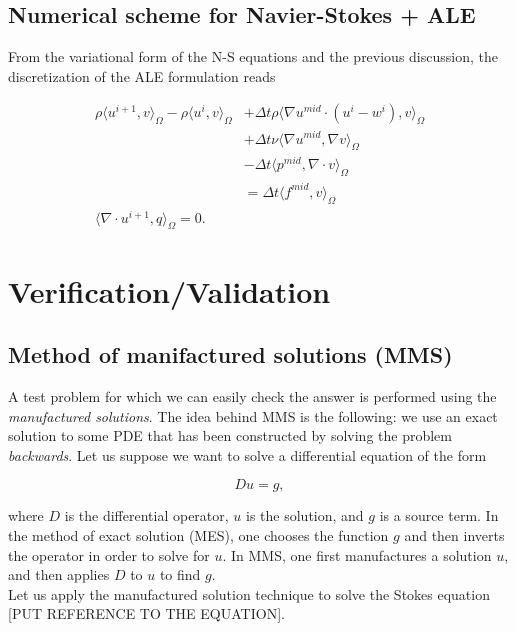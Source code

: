 \documentclass[11pt,a4paper,titlepage]{report}
\begin{document}
\section{Numerical scheme for Navier-Stokes + ALE}
From the variational form of the N-S equations and the previous discussion, the discretization of the ALE formulation reads

\[
\begin{aligned}
\rho \langle u^{i+1},v \rangle_\Omega - \rho \langle u^i, v \rangle_\Omega & + \Delta t \rho \langle \nabla u^{mid} \cdot (u^i -w^i)  ,v \rangle_\Omega \\
& + \Delta t \nu \langle \nabla u^{mid}, \nabla v \rangle_\Omega \\
& - \Delta t \langle p^{mid} , \nabla \cdot v \rangle_\Omega \\
& = \Delta t \langle f^{mid} ,v \rangle_\Omega \\
\langle \nabla \cdot u^{i+1},q \rangle_\Omega = 0.
\end{aligned}
\]



\chapter{Verification/Validation}

\section{Method of manifactured solutions (MMS)}

A test problem for which we can easily check the answer is performed using the \textit{manufactured solutions}. The idea behind MMS is the following: we use an exact solution to some PDE that has been constructed by solving the problem \textit{backwards}. Let us suppose we want to solve a differential equation of the form 

\[
Du = g,
\]

where $D$ is the differential operator, $u$ is the solution, and $g$ is a source term. In the method of exact solution (MES), one chooses the function $g$ and then inverts the operator in order to solve for $u$. In MMS, one first manufactures a solution $u$, and then applies $D$ to $u$ to find $g$. \\

Let us apply the manufactured solution technique to solve the Stokes equation [PUT REFERENCE TO THE EQUATION]. 
\end{document}
